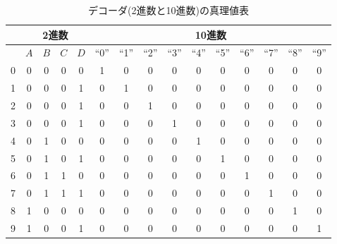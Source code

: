 \begin{table}[!h]
    \caption{デコーダ(2進数と10進数)の真理値表}
    \label{tbl11}
    \begin{center}
        \begin{tabular}{|c||c|c|c|c||c|c|c|c|c|c|c|c|c|c|}
            \hline
              & \multicolumn{4}{|c|}{2進数} & \multicolumn{10}{|c|}{10進数}                                                                                             \\ \hline
              & $A$                         & $B$                           & $C$ & $D$ & ``0'' & ``1'' & ``2'' & ``3'' & ``4'' & ``5'' & ``6'' & ``7'' & ``8'' & ``9'' \\
            \hhline{|=#=|=|=|=#=|=|=|=|=|=|=|=|=|=|}
            0 & 0                           & 0                             & 0   & 0   & 1     & 0     & 0     & 0     & 0     & 0     & 0     & 0     & 0     & 0     \\ \hline
            1 & 0                           & 0                             & 0   & 1   & 0     & 1     & 0     & 0     & 0     & 0     & 0     & 0     & 0     & 0     \\ \hline
            2 & 0                           & 0                             & 0   & 1   & 0     & 0     & 1     & 0     & 0     & 0     & 0     & 0     & 0     & 0     \\ \hline
            3 & 0                           & 0                             & 0   & 1   & 0     & 0     & 0     & 1     & 0     & 0     & 0     & 0     & 0     & 0     \\ \hline
            4 & 0                           & 1                             & 0   & 0   & 0     & 0     & 0     & 0     & 1     & 0     & 0     & 0     & 0     & 0     \\ \hline
            5 & 0                           & 1                             & 0   & 1   & 0     & 0     & 0     & 0     & 0     & 1     & 0     & 0     & 0     & 0     \\ \hline
            6 & 0                           & 1                             & 1   & 0   & 0     & 0     & 0     & 0     & 0     & 0     & 1     & 0     & 0     & 0     \\ \hline
            7 & 0                           & 1                             & 1   & 1   & 0     & 0     & 0     & 0     & 0     & 0     & 0     & 1     & 0     & 0     \\ \hline
            8 & 1                           & 0                             & 0   & 0   & 0     & 0     & 0     & 0     & 0     & 0     & 0     & 0     & 1     & 0     \\ \hline
            9 & 1                           & 0                             & 0   & 1   & 0     & 0     & 0     & 0     & 0     & 0     & 0     & 0     & 0     & 1     \\ \hline
        \end{tabular}
    \end{center}
\end{table}

